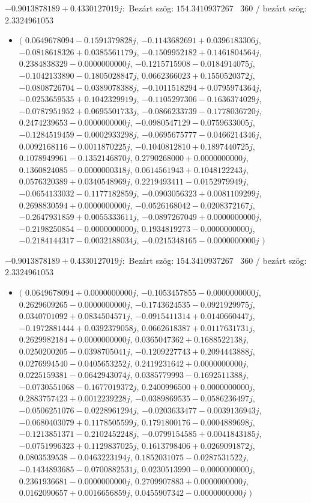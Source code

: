 \documentclass[14pt,a4paper]{article}
\begin{document}
$-0.9013878189+0.4330127019j$:\
Bezárt szög: $154.3410937267$ \
360 / bezárt szög: $2.3324961053$\
\begin{itemize}
\item
$\big($
$0.0649678094-0.1591379828j$, $-0.1143682691+0.0396183306j$, $-0.0818618326+0.0385561179j$, $-0.1509952182+0.1461804564j$, $0.2384838329-0.0000000000j$, $-0.1215715908-0.0184914075j$, $-0.1042133890-0.1805028847j$, $0.0662366023+0.1550520372j$, $-0.0808726704-0.0389078388j$, $-0.1011518294+0.0795974364j$, $-0.0253659535+0.1042329919j$, $-0.1105297306-0.1636374029j$, $-0.0787951952+0.0695501733j$, $-0.0866233739-0.1778036720j$, $0.2474239653-0.0000000000j$, $-0.0980547129-0.0759633005j$, $-0.1284519459-0.0002933298j$, $-0.0695675777-0.0466214346j$, $0.0092168116-0.0011870225j$, $-0.1040812810+0.1897440725j$, $0.1078949961-0.1352146870j$, $0.2790268000+0.0000000000j$, $0.1360824085-0.0000000318j$, $0.0614561943+0.1048122243j$, $0.0576320389+0.0340548969j$, $0.2219493411-0.0152979949j$, $-0.0654133032-0.1177182859j$, $-0.0903056323+0.0081109299j$, $0.2698830594+0.0000000000j$, $-0.0526168042-0.0208372167j$, $-0.2647931859+0.0055333611j$, $-0.0897267049+0.0000000000j$, $-0.2198250854-0.0000000000j$, $0.1934819273-0.0000000000j$, $-0.2184144317-0.0032188034j$, $-0.0215348165-0.0000000000j$
$\big)$
\end{itemize}
$-0.9013878189+0.4330127019j$:\
Bezárt szög: $154.3410937267$ \
360 / bezárt szög: $2.3324961053$\
\begin{itemize}
\item
$\big($
$0.0649678094+0.0000000000j$, $-0.1053457855-0.0000000000j$, $0.2629609265-0.0000000000j$, $-0.1743624535-0.0921929975j$, $0.0340701092+0.0834504571j$, $-0.0915411314+0.0140660447j$, $-0.1972881444+0.0392379058j$, $0.0662618387+0.0117631731j$, $0.2629982184+0.0000000000j$, $0.0365047362+0.1688522138j$, $0.0250200205-0.0398705041j$, $-0.1209227743+0.2094443888j$, $0.0276994540-0.0405653252j$, $0.2419231642+0.0000000000j$, $0.0225159381-0.0642943074j$, $0.0385779993-0.1692511388j$, $-0.0730551068-0.1677019372j$, $0.2400996500+0.0000000000j$, $0.2883757423+0.0012239228j$, $-0.0389869535-0.0586236497j$, $-0.0506251076-0.0228961294j$, $-0.0203633477-0.0039136943j$, $-0.0680403079+0.1178505599j$, $0.1791800176-0.0004889698j$, $-0.1213851371-0.2102452248j$, $-0.0799154585+0.0041843185j$, $-0.0751996323+0.1129837025j$, $0.1613798406+0.0269091872j$, $0.0803539538-0.0463223194j$, $0.1852031075-0.0287531522j$, $-0.1434893685-0.0700882531j$, $0.0230513990-0.0000000000j$, $0.2361936681-0.0000000000j$, $0.2709907883+0.0000000000j$, $0.0162090657+0.0016656859j$, $0.0455907342-0.0000000000j$
$\big)$
\end{itemize}
\end{document}
